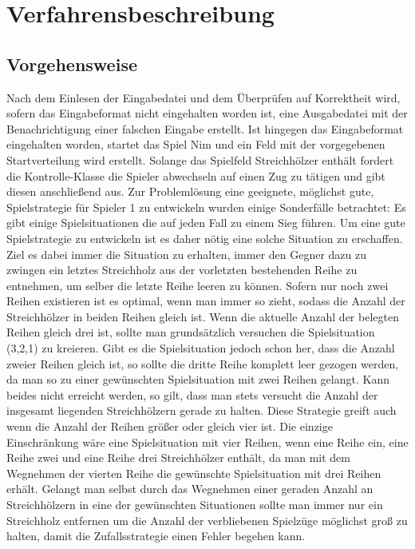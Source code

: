 \chapter{Verfahrensbeschreibung}
\label{chap:Verfahrensbeschreibung}

\section{Vorgehensweise}

Nach dem Einlesen der Eingabedatei und dem Überprüfen auf Korrektheit wird, sofern das Eingabeformat nicht eingehalten worden ist, eine Ausgabedatei mit der Benachrichtigung einer falschen Eingabe erstellt. Ist hingegen das Eingabeformat eingehalten worden, startet das Spiel Nim und ein Feld mit der vorgegebenen Startverteilung wird erstellt. Solange das Spielfeld Streichhölzer enthält fordert die Kontrolle-Klasse die Spieler abwechseln auf einen Zug zu tätigen und gibt diesen anschließend aus. \newline
Zur Problemlösung eine geeignete, möglichst gute, Spielstrategie für Spieler 1 zu entwickeln wurden einige Sonderfälle betrachtet: Es gibt einige Spielsituationen die auf jeden Fall zu einem Sieg führen. Um eine gute Spielstrategie zu entwickeln ist es daher nötig eine solche Situation zu erschaffen. Ziel es dabei immer die Situation zu erhalten, immer den Gegner dazu zu zwingen ein letztes Streichholz aus der vorletzten bestehenden Reihe zu entnehmen, um selber die letzte Reihe leeren zu können.\newline
Sofern nur noch zwei Reihen existieren ist es optimal, wenn man immer so zieht, sodass die Anzahl der Streichhölzer in beiden Reihen gleich ist.\newline
Wenn die aktuelle Anzahl der belegten Reihen gleich drei ist, sollte man grundsätzlich versuchen die Spielsituation (3,2,1) zu kreieren. Gibt es die Spielsituation jedoch schon her, dass die Anzahl zweier Reihen gleich ist, so sollte die dritte Reihe komplett leer gezogen werden, da man so zu einer gewünschten Spielsituation mit zwei Reihen gelangt. Kann beides nicht erreicht werden, so gilt, dass man stets versucht die Anzahl der insgesamt liegenden Streichhölzern gerade zu halten. Diese Strategie greift auch wenn die Anzahl der Reihen größer oder gleich vier ist. Die einzige Einschränkung wäre eine Spielsituation mit vier Reihen, wenn eine Reihe ein, eine Reihe zwei und eine Reihe drei Streichhölzer enthält, da man mit dem Wegnehmen der vierten Reihe die gewünschte Spielsituation mit drei Reihen erhält.\newline
Gelangt man selbst durch das Wegnehmen einer geraden Anzahl an Streichhölzern in eine der gewünschten Situationen sollte man immer nur ein Streichholz entfernen um die Anzahl der verbliebenen Spielzüge möglichst groß zu halten, damit die Zufallsstrategie einen Fehler begehen kann.  \newline

